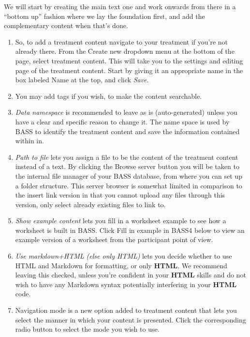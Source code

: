 \documentclass[]{book}
\providecommand{\tightlist}{%
  \setlength{\itemsep}{0pt}\setlength{\parskip}{0pt}}
\begin{document}
We will start by creating the main text one and work onwards from there in a ``bottom up'' fashion where we lay the foundation first, and add the complementary content when that's done.

\begin{enumerate}
\def\labelenumi{\arabic{enumi}.}
\tightlist
\item
  So, to add a treatment content navigate to your treatment if you're not already there. From the Create new dropdown menu at the bottom of the page, select treatment content. This will take you to the settings and editing page of the treatment content. Start by giving it an appropriate name in the box labeled Name at the top, and click \emph{Save}.
\item
  You may add tags if you wish, to make the content searchable.
\item
  \emph{Data namespace} is recommended to leave as is (auto-generated) unless you have a clear and specific reason to change it. The name space is used by BASS to identify the treatment content and save the information contained within in.
\item
  \emph{Path to file} lets you assign a file to be the content of the treatment content instead of a text. By clicking the Browse server button you will be taken to the internal file manager of your BASS database, from where you can set up a folder structure. This server browser is somewhat limited in comparison to the insert link version in that you cannot upload any files through this version, only select already existing files to link to.
\item
  \emph{Show example content} lets you fill in a worksheet example to see how a worksheet is built in BASS. Click Fill in example in BASS4 below to view an example version of a worksheet from the participant point of view.
\item
  \emph{Use markdown+HTML (else only HTML)} lets you decide whether to use HTML and Markdown for formatting, or only \textbf{HTML}. We recommend leaving this checked, unless you're confident in your \textbf{HTML} skills and do not wish to have any Markdown syntax potentially interfering in your \textbf{HTML} code.
\item
  Navigation mode is a new option added to treatment content that lets you select the manner in which your content is presented. Click the corresponding radio button to select the mode you wish to use.


\end{enumerate}
\end{document}
